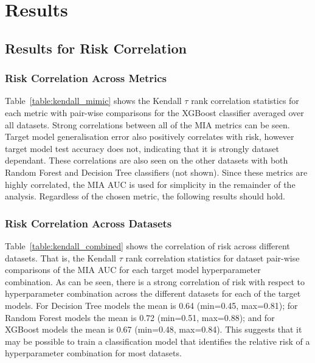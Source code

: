 \section{Results}%
\label{sec:results}

\subsection{Results for Risk Correlation}%

\subsubsection{Risk Correlation Across Metrics}

Table~\ref{table:kendall_mimic} shows the Kendall $\tau$ rank correlation statistics for each metric with pair-wise comparisons for the XGBoost classifier averaged over all datasets. Strong correlations between all of the MIA metrics can be seen. Target model generalisation error also positively correlates with risk, however target model test accuracy does not, indicating that it is strongly dataset dependant. These correlations are also seen on the other datasets with both Random Forest and Decision Tree classifiers (not shown). Since these metrics are highly correlated, the MIA AUC is used for simplicity in the remainder of the analysis. Regardless of the chosen metric, the following results should hold.



\subsubsection{Risk Correlation Across Datasets}

Table~\ref{table:kendall_combined} shows the correlation of risk across different datasets. That is, the Kendall $\tau$ rank correlation statistics for dataset pair-wise comparisons of the MIA AUC for each target model hyperparameter combination. As can be seen, there is a strong correlation of risk with respect to hyperparameter combination across the different datasets for each of the target models. For Decision Tree models the mean is 0.64 (min=0.45, max=0.81); for Random Forest models the mean is 0.72 (min=0.51, max=0.88); and for XGBoost models the mean is 0.67 (min=0.48, max=0.84). This suggests that it may be possible to train a classification model that identifies the relative risk of a hyperparameter combination for most datasets.

